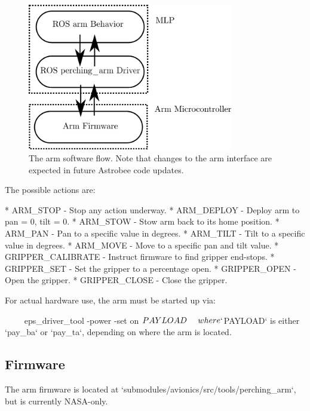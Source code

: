 \documentclass{article}
\begin{document}
\begin{figure}[h!]
    \centering
    \includegraphics[width=0.8\textwidth]{img/arm_diag.png}
    \caption{The arm software flow. Note that changes to the arm interface are expected in future Astrobee code updates.}
    \label{fig:arm}
\end{figure}

\begin{markdown}
The possible actions are:

* ARM_STOP - Stop any action underway.
* ARM_DEPLOY - Deploy arm to pan = 0, tilt = 0.
* ARM_STOW - Stow arm back to its home position.
* ARM_PAN - Pan to a specific value in degrees.
* ARM_TILT - Tilt to a specific value in degrees.
* ARM_MOVE - Move to a specific pan and tilt value.
* GRIPPER_CALIBRATE - Instruct firmware to find gripper end-stops.
* GRIPPER_SET - Set the gripper to a percentage open.
* GRIPPER_OPEN - Open the gripper.
* GRIPPER_CLOSE - Close the gripper.
\end{markdown}

For actual hardware use, the arm must be started up via:

\begin{markdown}
~~~~
eps_driver_tool -power -set on $PAYLOAD
~~~~

where `$PAYLOAD` is either `pay_ba` or `pay_ta`, depending on where the arm is located.
\end{markdown}

\subsection{Firmware}
\begin{markdown}
The arm firmware is located at `submodules/avionics/src/tools/perching_arm`, but is currently NASA-only.
\end{markdown}
\end{document}
